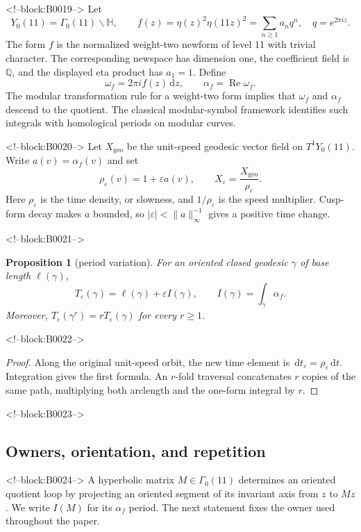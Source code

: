 \documentclass[11pt]{article}
\newtheorem{proposition}[theorem]{Proposition}
\theoremstyle{definition}
\theoremstyle{remark}
\newcommand{\G}{\Gamma_0(11)}
\newcommand{\HH}{\mathbb H}
\newcommand{\QQ}{\mathbb Q}
\newcommand{\e}{\varepsilon}
\newcommand{\dd}{\,\mathrm d}
\begin{document}
<!--block:B0019-->
Let
\[
Y_0(11)=\G\backslash\HH,
\qquad
f(z)=\eta(z)^2\eta(11z)^2=\sum_{n\geq1}a_nq^n,
\quad q=e^{2\pi iz}.
\]
The form $f$ is the normalized weight-two newform of level 11 with trivial character. The corresponding newspace has dimension one, the coefficient field is $\QQ$, and the displayed eta product has $a_1=1$.
\citep[Properties and q-expansion]{lmfdb112aa}
Define
\[
\omega_f=2\pi i f(z)\dd z,
\qquad
\alpha_f=\operatorname{Re}\omega_f.
\]
The modular transformation rule for a weight-two form implies that $\omega_f$ and $\alpha_f$ descend to the quotient. The classical modular-symbol framework identifies such integrals with homological periods on modular curves.
\citep[pp.~19--25]{manin1972}

<!--block:B0020-->
Let $X_{\mathrm{geo}}$ be the unit-speed geodesic vector field on $T^1Y_0(11)$. Write $a(v)=\alpha_f(v)$ and set
\[
\rho_\e(v)=1+\e a(v),
\qquad
X_\e=\frac{X_{\mathrm{geo}}}{\rho_\e}.
\]
Here $\rho_\e$ is the time density, or slowness, and $1/\rho_\e$ is the speed multiplier. Cusp-form decay makes $a$ bounded, so $|\e|<\lVert a\rVert_\infty^{-1}$ gives a positive time change.

<!--block:B0021-->
\begin{proposition}[period variation]\label{prop:period}
For an oriented closed geodesic $\gamma$ of base length $\ell(\gamma)$,
\[
T_\e(\gamma)=\ell(\gamma)+\e I(\gamma),
\qquad
I(\gamma)=\int_\gamma\alpha_f.
\]
Moreover, $T_\e(\gamma^r)=rT_\e(\gamma)$ for every $r\geq1$.
\end{proposition}

<!--block:B0022-->
\begin{proof}
Along the original unit-speed orbit, the new time element is $\dd t_\e=\rho_\e\dd t$. Integration gives the first formula. An $r$-fold traversal concatenates $r$ copies of the same path, multiplying both arclength and the one-form integral by $r$.
\end{proof}

<!--block:B0023-->
\subsection{Owners, orientation, and repetition}

<!--block:B0024-->
A hyperbolic matrix $M\in\G$ determines an oriented quotient loop by projecting an oriented segment of its invariant axis from $z$ to $Mz$. We write $I(M)$ for its $\alpha_f$ period. The next statement fixes the owner used throughout the paper.
\end{document}
